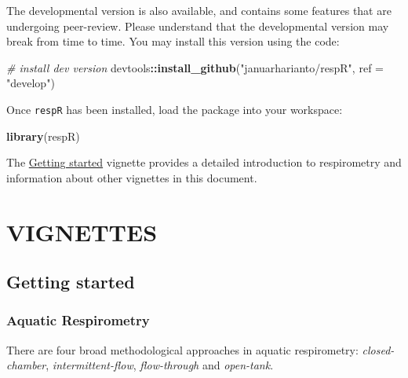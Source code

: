 \documentclass[]{book}
\newenvironment{Shaded}{\begin{snugshade}}{\end{snugshade}}
\newcommand{\KeywordTok}[1]{\textcolor[rgb]{0.13,0.29,0.53}{\textbf{#1}}}
\newcommand{\DataTypeTok}[1]{\textcolor[rgb]{0.13,0.29,0.53}{#1}}
\newcommand{\StringTok}[1]{\textcolor[rgb]{0.31,0.60,0.02}{#1}}
\newcommand{\CommentTok}[1]{\textcolor[rgb]{0.56,0.35,0.01}{\textit{#1}}}
\newcommand{\OperatorTok}[1]{\textcolor[rgb]{0.81,0.36,0.00}{\textbf{#1}}}
\newcommand{\NormalTok}[1]{#1}
\begin{document}
The developmental version is also available, and contains some features
that are undergoing peer-review. Please understand that the
developmental version may break from time to time. You may install this
version using the code:

\begin{Shaded}
\begin{Highlighting}[]
\CommentTok{# install dev version}
\NormalTok{devtools}\OperatorTok{::}\KeywordTok{install_github}\NormalTok{(}\StringTok{"januarharianto/respR"}\NormalTok{, }\DataTypeTok{ref =} \StringTok{"develop"}\NormalTok{)}
\end{Highlighting}
\end{Shaded}

Once \texttt{respR} has been installed, load the package into your
workspace:

\begin{Shaded}
\begin{Highlighting}[]
\KeywordTok{library}\NormalTok{(respR)}
\end{Highlighting}
\end{Shaded}

The \protect\hyperlink{getting-started}{Getting started} vignette
provides a detailed introduction to respirometry and information about
other vignettes in this document.

\part*{VIGNETTES}\label{part-vignettes}

\hypertarget{getting-started}{\chapter{Getting
started}\label{getting-started}}

\section{Aquatic Respirometry}\label{aquatic-respirometry}

There are four broad methodological approaches in aquatic respirometry:
\emph{closed-chamber}, \emph{intermittent-flow}, \emph{flow-through} and
\emph{open-tank}.
\end{document}
